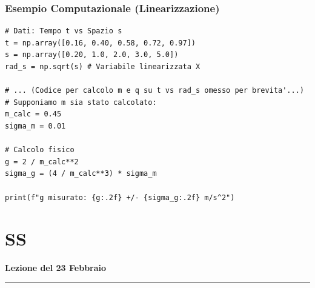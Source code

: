 \documentclass[a4paper,11pt]{article}
\theoremstyle{remark}
\newcommand{\thelezione}{}
\newcommand{\lezione}[2]{
\newpage
\renewcommand{\thelezione}{#2} %
\section{#1} %
\noindent\textbf{\color{RoyalBlue}Lezione del #2}\par\vspace{0.5em}\hrule\vspace{1em}
}
\begin{document}
\subsubsection*{Esempio Computazionale (Linearizzazione)}
\begin{lstlisting}[caption={Linearizzazione per calcolo di g}]
# Dati: Tempo t vs Spazio s
t = np.array([0.16, 0.40, 0.58, 0.72, 0.97]) 
s = np.array([0.20, 1.0, 2.0, 3.0, 5.0])
rad_s = np.sqrt(s) # Variabile linearizzata X

# ... (Codice per calcolo m e q su t vs rad_s omesso per brevita'...)
# Supponiamo m sia stato calcolato:
m_calc = 0.45 
sigma_m = 0.01

# Calcolo fisico
g = 2 / m_calc**2
sigma_g = (4 / m_calc**3) * sigma_m

print(f"g misurato: {g:.2f} +/- {sigma_g:.2f} m/s^2")
\end{lstlisting}



\lezione{SS}{23 Febbraio}
\end{document}

